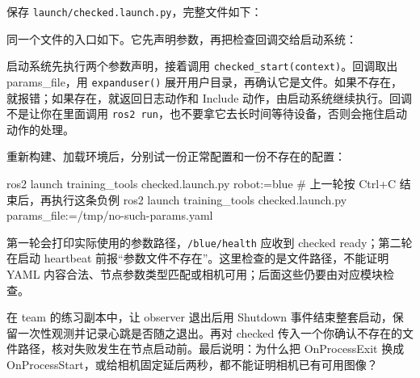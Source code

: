 \begin{example}[检查配置文件后再启动]
保存 \nolinkurl{launch/checked.launch.py}，完整文件如下：
\par\medskip\noindent\begin{minipage}{\linewidth}

\end{minipage}\par\smallskip
同一个文件的入口如下。它先声明参数，再把检查回调交给启动系统：
\par\medskip\noindent\begin{minipage}{\linewidth}

\end{minipage}\par\smallskip

启动系统先执行两个参数声明，接着调用 \texttt{checked\_start(context)}。回调取出 params\_file，用 \texttt{expanduser()} 展开用户目录，再确认它是文件。如果不存在，就报错；如果存在，就返回日志动作和 Include 动作，由启动系统继续执行。回调不是让你在里面调用 \texttt{ros2 run}，也不要拿它去长时间等待设备，否则会拖住启动动作的处理。

重新构建、加载环境后，分别试一份正常配置和一份不存在的配置：
\par\medskip\noindent\begin{minipage}{\linewidth}
\begin{tbash}
ros2 launch training_tools checked.launch.py robot:=blue
# 上一轮按 Ctrl+C 结束后，再执行这条负例
ros2 launch training_tools checked.launch.py params_file:=/tmp/no-such-params.yaml
\end{tbash}
\end{minipage}\par\smallskip
第一轮会打印实际使用的参数路径，\texttt{/blue/health} 应收到 checked ready；第二轮在启动 heartbeat 前报“参数文件不存在”。这里检查的是文件路径，不能证明 YAML 内容合法、节点参数类型匹配或相机可用；后面这些仍要由对应模块检查。
\end{example}

\begin{exercise}
\label{ex:v2-ros-launch-runtime}
在 team 的练习副本中，让 observer 退出后用 Shutdown 事件结束整套启动，保留一次性观测并记录心跳是否随之退出。再对 checked 传入一个你确认不存在的文件路径，核对失败发生在节点启动前。最后说明：为什么把 OnProcessExit 换成 OnProcessStart，或给相机固定延后两秒，都不能证明相机已有可用图像？
\end{exercise}


